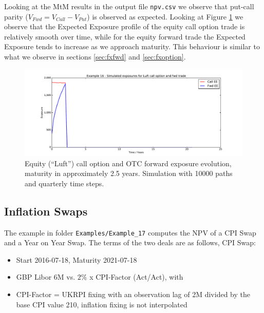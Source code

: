 \documentclass[12pt, a4paper]{article}
\begin{document}
Looking at the MtM results in the output file {\tt npv.csv} we observe that put-call parity ($V_{Fwd} = V_{Call} - 
V_{Put}$) is observed as expected. Looking at Figure \ref{fig_eq_call} we observe that the Expected Exposure profile of 
the equity call option trade is relatively smooth over time, while for the equity forward trade the Expected Exposure 
tends to increase as we approach maturity. This behaviour is similar to what we observe in sections \ref{sec:fxfwd} 
and \ref{sec:fxoption}. 

\begin{figure}[h!]
	\begin{center}
		\includegraphics[scale=0.45]{mpl_eq_call.pdf}
	\end{center}
	\caption{Equity (``Luft'') call option and OTC forward exposure evolution, maturity in approximately 2.5 years. 
	Simulation with 
	10000 paths and quarterly time steps.}
	\label{fig_eq_call}
\end{figure}

\subsection{Inflation Swaps}

The example in folder {\tt Examples/Example\_17} computes the NPV of a CPI Swap and a Year on Year Swap. The terms of
the two deals are as follows, CPI Swap:

\begin{itemize}
\item Start 2016-07-18, Maturity 2021-07-18
\item GBP Libor 6M vs. $2\%$ x CPI-Factor (Act/Act), with
\item CPI-Factor = UKRPI fixing with an observation lag of 2M divided by the base CPI value 210, inflation fixing is not
  interpolated
\end{itemize}
\end{document}

